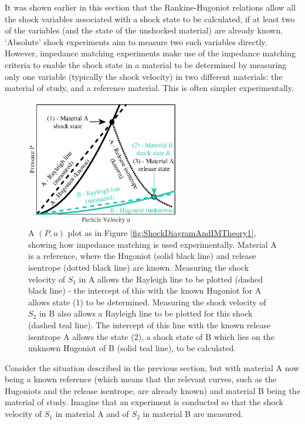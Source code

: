 
It was shown earlier in this section that the Rankine-Hugoniot relations allow all the shock variables associated with a shock state to be calculated, if at least two of the variables (and the state of the unshocked material) are already known. `Absolute' shock experiments aim to measure two such variables directly. However, impedance matching experiments make use of the impedance matching criteria to enable the shock state in a material to be determined by measuring only one variable (typically the shock velocity) in two different materials: the material of study, and a reference material. This is often simpler experimentally.

\begin{figure}
\centering
\includegraphics[width=0.6\textwidth]{figures/Theory/MatlabIM2.eps}%
\caption{\label{fig:IMTheory2} A $(P,u)$ plot as in Figure \ref{fig:ShockDiagramAndIMTheory1}, showing how impedance matching is used experimentally. Material A is a reference, where the Hugoniot (solid black line) and release isentrope (dotted black line) are known. Measuring the shock velocity of $S_1$ in A allows the Rayleigh line to be plotted (dashed black line) - the intercept of this with the known Hugoniot for A allows state (1) to be determined. Measuring the shock velocity of $S_2$ in B also allows a Rayleigh line to be plotted for this shock (dashed teal line). The intercept of this line with the known release isentrope A allows the state (2), a shock state of B which lies on the unknown Hugoniot of B (solid teal line), to be calculated.}
\end{figure}

Consider the situation described in the previous section, but with material A now being a known reference (which means that the relevant curves, such as the Hugoniots and the release isentrope, are already known) and material B being the material of study. Imagine that an experiment is conducted so that the shock velocity of $S_1$ in material A and of $S_2$ in material B are measured.

